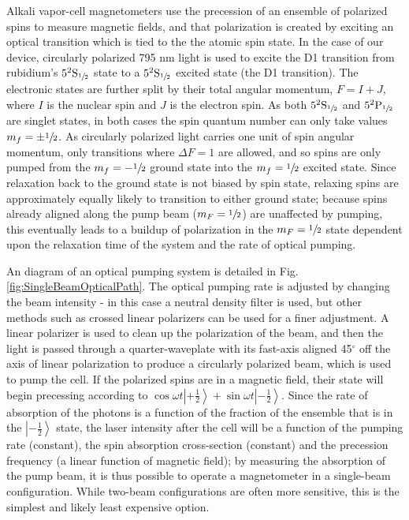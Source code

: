 \documentclass[PaulGanssle-Thesis.tex]{subfiles}
\begin{document}
Alkali vapor-cell magnetometers use the precession of an ensemble of polarized spins to measure magnetic fields, and that polarization is created by exciting an optical transition which is tied to the the atomic spin state. In the case of our device, circularly polarized 795 nm light is used to excite the D1 transition from rubidium's $5^{2}\textrm{S}_{\sfrac{1}{2}}$ state to a $5^{2}\textrm{S}_{\sfrac{1}{2}}$ excited state (the D1 transition). The electronic states are further split by their total angular momentum, $F = I + J$, where $I$ is the nuclear spin and $J$ is the electron spin. As both $5^{2}\textrm{S}_{\sfrac{1}{2}}$ and $5^{2}\textrm{P}_{\sfrac{1}{2}}$ are singlet states, in both cases the spin quantum number can only take values $m_{f} = \pm \sfrac{1}{2}$. As circularly polarized light carries one unit of spin angular momentum, only transitions where $\Delta F = 1$ are allowed, and so spins are only pumped from the $m_{f} = -\sfrac{1}{2}$ ground state into the $m_{f} = \sfrac{1}{2}$ excited state. Since relaxation back to the ground state is not biased by spin state, relaxing spins are approximately equally likely to transition to either ground state; because spins already aligned along the pump beam ($m_{F} = \sfrac{1}{2}$) are unaffected by pumping, this eventually leads to a buildup of polarization in the $m_{F} = \sfrac{1}{2}$ state dependent upon the relaxation time of the system and the rate of optical pumping.\citep{Seltzer2008,Franzen1957} %

An diagram of an optical pumping system is detailed in Fig. \ref{fig:SingleBeamOpticalPath}. The optical pumping rate is adjusted by changing the beam intensity - in this case a neutral density filter is used, but other methods such as crossed linear polarizers can be used for a finer adjustment. A linear polarizer is used to clean up the polarization of the beam, and then the light is passed through a quarter-waveplate with its fast-axis aligned 45$^\circ$ off the axis of linear polarization to produce a circularly polarized beam, which is used to pump the cell. If the polarized spins are in a magnetic field, their state will begin precessing according to $\cos{\omega{}t}\left|+\tfrac{1}{2}\right\rangle + \sin{\omega{}t}\left|-\tfrac{1}{2}\right\rangle$. Since the rate of absorption of the photons is a function of the fraction of the ensemble that is in the $\left|-\tfrac{1}{2}\right\rangle$ state, the laser intensity after the cell will be a function of the pumping rate (constant), the spin absorption cross-section (constant) and the precession frequency (a linear function of magnetic field); by measuring the absorption of the pump beam, it is thus possible to operate a magnetometer in a single-beam configuration. While two-beam configurations are often more sensitive, this is the simplest and likely least expensive option.\cite{shah-natphotonics-2007,Schwindt2007}
\end{document}
